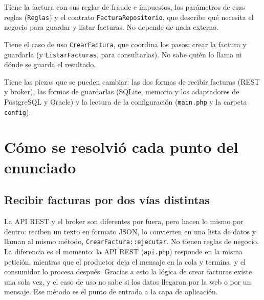\documentclass[10.5pt]{article}
\begin{document}
\begin{description}[leftmargin=0pt]
\item[Dominio (el centro).] Tiene la factura con sus reglas de fraude e impuestos, los
parámetros de esas reglas (\texttt{Reglas}) y el contrato \texttt{FacturaRepositorio}, que
describe qué necesita el negocio para guardar y listar facturas. No depende de nada externo.
\item[Aplicación.] Tiene el caso de uso \texttt{CrearFactura}, que coordina los pasos: crear la
factura y guardarla (y \texttt{ListarFacturas}, para consultarlas). No sabe quién lo llama ni
dónde se guarda el resultado.
\item[Infraestructura (lo de afuera).] Tiene las piezas que se pueden cambiar: las dos formas de
recibir facturas (REST y broker), las formas de guardarlas (SQLite, memoria y los adaptadores
de PostgreSQL y Oracle) y la lectura de la configuración (\texttt{main.php} y la carpeta
\texttt{config}).
\end{description}

\section{Cómo se resolvió cada punto del enunciado}

\subsection{Recibir facturas por dos vías distintas}
La API REST y el broker son diferentes por fuera, pero hacen lo mismo por dentro: reciben un
texto en formato JSON, lo convierten en una lista de datos y llaman al mismo método,
\texttt{CrearFactura::ejecutar}. No tienen reglas de negocio. La diferencia es el momento: la API
REST (\texttt{api.php}) responde en la misma petición, mientras que el productor deja el mensaje
en la cola y termina, y el consumidor lo procesa después. Gracias a esto la lógica de crear
facturas existe una sola vez, y el caso de uso no sabe si los datos llegaron por la web o por un
mensaje. Ese método es el punto de entrada a la capa de aplicación.
\end{document}
